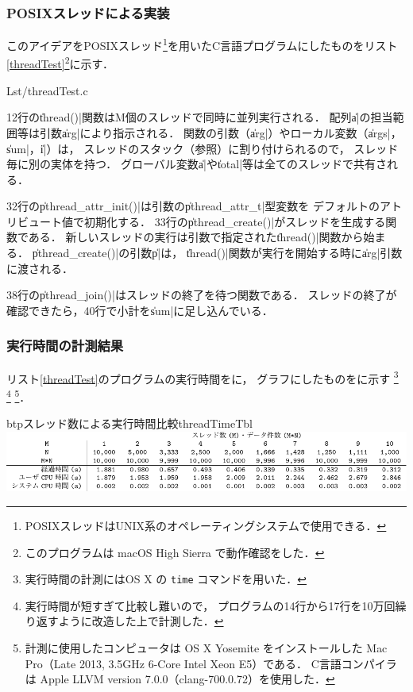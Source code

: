 \subsubsection{POSIXスレッドによる実装}
このアイデアをPOSIXスレッド\footnote{
  POSIXスレッドはUNIX系のオペレーティングシステムで使用できる．
}を用いたC言語プログラムにしたものをリスト\ref{threadTest}\footnote{
  このプログラムは macOS High Sierra で動作確認をした．
}に示す．


  {Lst/threadTest.c}

12行の\|thread()|関数はM個のスレッドで同時に並列実行される．
配列\|a|の担当範囲等は引数\|arg|により指示される．
関数の引数（\|arg|）やローカル変数（\|args|，\|sum|，\|i|）は，
スレッドのスタック（参照）に割り付けられるので，
スレッド毎に別の実体を持つ．
グローバル変数\|a|や\|total|等は全てのスレッドで共有される．

32行の\|pthread_attr_init()|は引数の\|pthread_attr_t|型変数を
デフォルトのアトリビュート値で初期化する．
33行の\|pthread_create()|がスレッドを生成する関数である．
新しいスレッドの実行は引数で指定された\|thread()|関数から始まる．
\|pthread_create()|の引数\|p|は，
\|thread()|関数が実行を開始する時に\|arg|引数に渡される．

38行の\|pthread_join()|はスレッドの終了を待つ関数である．
スレッドの終了が確認できたら，40行で小計を\|sum|に足し込んでいる．

\subsubsection{実行時間の計測結果}
リスト\ref{threadTest}のプログラムの実行時間をに，
グラフにしたものをに示す
\footnote{
  実行時間の計測にはOS X の \texttt{time} コマンドを用いた．
}
\footnote{
  実行時間が短すぎて比較し難いので，
  プログラムの14行から17行を10万回繰り返すように改造した上で計測した．}
\footnote{
  計測に使用したコンピュータは
  OS X Yosemite をインストールした
  Mac Pro（Late 2013, 3.5GHz 6-Core Intel Xeon E5）である．
  C言語コンパイラは
  Apple LLVM version 7.0.0（clang-700.0.72）を使用した．
}．

\begin{mytable}{btp}{スレッド数による実行時間比較}{threadTimeTbl}
  \includegraphics[scale=1.0]{Tbl/threadTimeTbl.pdf}
\end{mytable}

